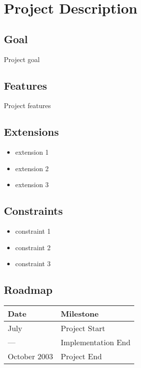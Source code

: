 \documentclass[10pt]{article}
\begin{document}
\section{Project Description}

\subsection{Goal}

Project goal

\subsection{Features}

Project features

\subsection{Extensions}

\begin{itemize}

\item extension 1
\item extension 2
\item extension 3

\end{itemize}

\subsection{Constraints}

\begin{itemize}

\item constraint 1
\item constraint 2
\item constraint 3

\end{itemize}

\subsection{Roadmap}

\begin{table}[ht]
\begin{center}
\begin{tabular}{p{3cm}p{12cm}}
{\bf Date} & {\bf Milestone}\\ \hline \hline
July & Project Start\\ \hline
--- & Implementation End\\ \hline
October 2003 & Project End\\ \hline
\end{tabular}
\end{center}
\end{table}
                   


\end{document}
